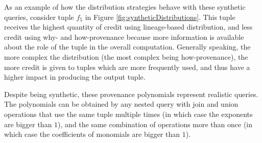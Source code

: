 


As an example of how the distribution strategies behave with these synthetic queries, consider tuple $f_5$ in Figure \ref{fig:syntheticDistributions}.
This tuple receives the highest quantity of credit using lineage-based distribution, and less credit using why- and how-provenance because more information is available about the role of the tuple in the overall computation. 
Generally speaking, the more complex the distribution (the most complex being how-provenance), the more credit is given to tuples which are more frequently used, and thus have a higher impact in producing the output tuple. 

Despite being synthetic, these provenance polynomials represent realistic queries.  The polynomials can be obtained by any nested query with join and union operations that use the same tuple multiple times (in which case the exponents are bigger than $1$), and the same combination of operations more than once (in which case the coefficients of monomials are bigger than $1$). 

